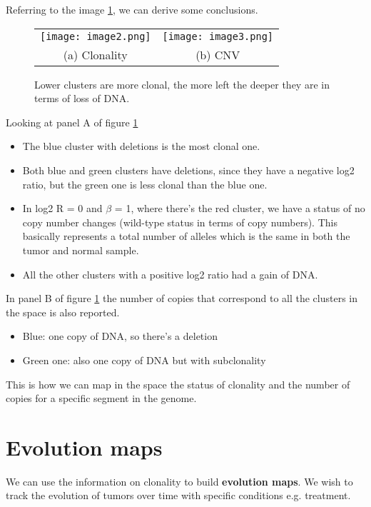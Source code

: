 Referring to the image \ref{fig:cluster0}, we can derive some conclusions.

\begin{figure}[H]
\begin{tabular}{cc}
  \texttt{[image: image2.png]} &   \texttt{[image: image3.png]} \\
(a) Clonality & (b) CNV \\[6pt]
\end{tabular}
\caption{Lower clusters are more clonal, the more left the deeper they are in terms of loss of DNA.}
\label{fig:cluster0}
\end{figure}

Looking at panel A of figure \ref{fig:cluster0}
\begin{itemize}
\item The blue cluster with deletions is the most clonal one.
\item Both blue and green clusters have deletions, since they have a negative log2 ratio, but the green one is less clonal than the blue one.
\item In log2 R = 0 and $\beta$ = 1, where there's the red cluster, we have a status of no copy number changes (wild-type status in terms of copy numbers). This basically represents a total number of alleles which is the same in both the tumor and normal sample.
\item All the other clusters with a positive log2 ratio had a gain of DNA.
\end{itemize}

In panel B of figure \ref{fig:cluster0} the number of copies that correspond to all the clusters in the space is also reported.

\begin{itemize}
\item Blue: one copy of DNA, so there's a deletion
\item Green one: also one copy of DNA but with subclonality
\end{itemize}

This is how we can map in the space the status of clonality and the number of copies for a specific segment in the genome.


\section{Evolution maps}
We can use the information on clonality to build \textbf{evolution maps}. We wish to track the evolution of tumors over time with specific conditions e.g. treatment.

